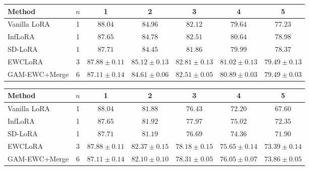 \begin{tabular}{lcccccc}
\toprule
Method & $n$ & 1 & 2 & 3 & 4 & 5 \\
\midrule
Vanilla LoRA & 1 & $88.04$ & $84.96$ & $82.12$ & $79.64$ & $77.23$ \\
InfLoRA & 1 & $87.65$ & $84.78$ & $82.51$ & $80.64$ & $78.98$ \\
SD-LoRA & 1 & $87.71$ & $84.45$ & $81.86$ & $79.99$ & $78.37$ \\
EWCLoRA & 3 & $87.88\pm 0.11$ & $85.12\pm 0.13$ & $82.81\pm 0.13$ & $81.02\pm 0.13$ & $79.49\pm 0.13$ \\
GAM-EWC$+$Merge & 6 & $87.11\pm 0.14$ & $84.61\pm 0.06$ & $82.51\pm 0.05$ & $80.89\pm 0.03$ & $79.49\pm 0.03$ \\
\bottomrule
\end{tabular}

\begin{tabular}{lcccccc}
\toprule
Method & $n$ & 1 & 2 & 3 & 4 & 5 \\
\midrule
Vanilla LoRA & 1 & $88.04$ & $81.88$ & $76.43$ & $72.20$ & $67.60$ \\
InfLoRA & 1 & $87.65$ & $81.92$ & $77.97$ & $75.02$ & $72.35$ \\
SD-LoRA & 1 & $87.71$ & $81.19$ & $76.69$ & $74.36$ & $71.90$ \\
EWCLoRA & 3 & $87.88\pm 0.11$ & $82.37\pm 0.15$ & $78.18\pm 0.15$ & $75.65\pm 0.14$ & $73.39\pm 0.14$ \\
GAM-EWC$+$Merge & 6 & $87.11\pm 0.14$ & $82.10\pm 0.10$ & $78.31\pm 0.05$ & $76.05\pm 0.07$ & $73.86\pm 0.05$ \\
\bottomrule
\end{tabular}
